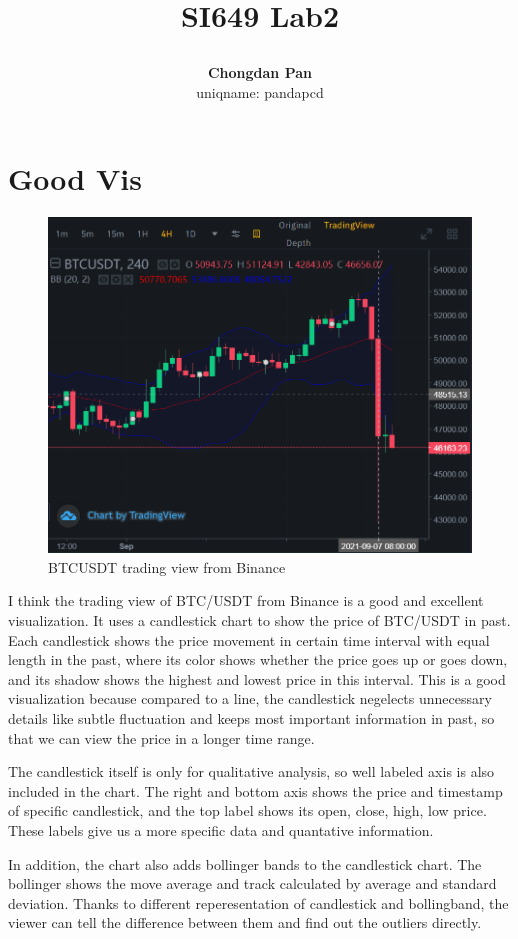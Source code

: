 \documentclass[a4paper]{article}
\title{\Large \textbf{SI649 Lab2}\\
\author{\textbf{Chongdan Pan}\\
uniqname: pandapcd
}
}
\begin{document}
\maketitle
\section{Good Vis}
\begin{figure}[H]
    \centering
    \includegraphics[scale=0.4]{BTCUSDT.png}
    \caption{BTCUSDT trading view from Binance}
\end{figure}
I think the trading view of BTC/USDT from Binance is a good and excellent visualization. It uses a candlestick chart to show the price of BTC/USDT in past. Each candlestick shows the price movement in certain time interval with equal length in the past, where its color shows whether the price goes up or goes down, and its shadow shows the highest and lowest price in this interval. This is a good visualization because compared to a line, the candlestick negelects unnecessary details like subtle fluctuation and keeps most important information in past, so that we can view the price in a longer time range. 
\par The candlestick itself is only for qualitative analysis, so well labeled axis is also included in the chart. The right and bottom axis shows the price and timestamp of specific candlestick, and the top label shows its open, close, high, low price. These labels give us a more specific data and quantative information.
\par In addition, the chart also adds bollinger bands to the candlestick chart. The bollinger shows the move average and track calculated by average and standard deviation. Thanks to different reperesentation of candlestick and bollingband, the viewer can tell the difference between them and find out the outliers directly.
\end{document}
